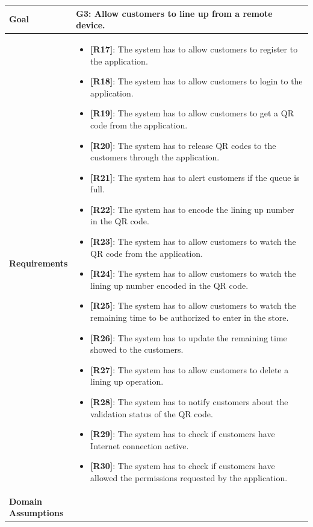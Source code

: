 \begin{table}[H]
\centering
\begin{tabular}{| m{} | m{} |} 
	\hline
	\textbf{Goal} &
		\textbf{G3: Allow customers to line up from a remote device.} \\
	\hline
	\textbf{Requirements} &
		\begin{itemize}
			\item {\textbf{[R17]}}: The system has to allow customers to register to the application.
			\item {\textbf{[R18]}}: The system has to allow customers to login to the application.
			\item {\textbf{[R19]}}: The system has to allow customers to get a QR code from the application.
			\item {\textbf{[R20]}}: The system has to release QR codes to the customers through the application.
			\item {\textbf{[R21]}}: The system has to alert customers if the queue is full.
			\item {\textbf{[R22]}}: The system has to encode the lining up number in the QR code.
			\item {\textbf{[R23]}}: The system has to allow customers to watch the QR code from the application.
			\item {\textbf{[R24]}}: The system has to allow customers to watch the lining up number encoded in the QR code.
			\item {\textbf{[R25]}}: The system has to allow customers to watch the remaining time to be authorized to enter in the store.
			\item {\textbf{[R26]}}: The system has to update the remaining time showed to the customers.
			\item {\textbf{[R27]}}: The system has to allow customers to delete a lining up operation.
			\item {\textbf{[R28]}}: The system has to notify customers about the validation status of the QR code.
			\item {\textbf{[R29]}}: The system has to check if customers have Internet connection active.
			\item {\textbf{[R30]}}: The system has to check if customers have allowed the permissions requested by the application.
		\end{itemize} \\ 
	\hline
	\shortstack[l]{\textbf{Domain} \\ \textbf{Assumptions}} & 

\end{tabular}
\end{table}
